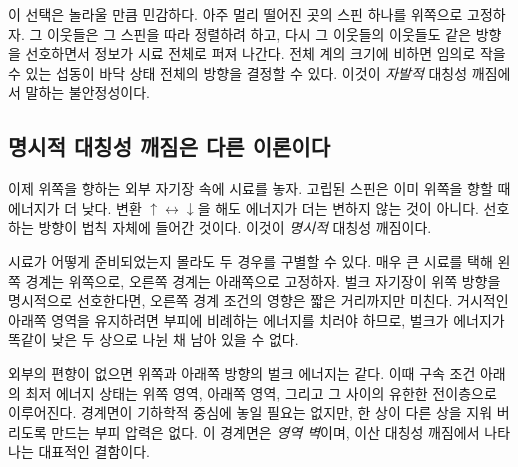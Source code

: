 이 선택은 놀라울 만큼 민감하다. 아주 멀리 떨어진 곳의 스핀 하나를 위쪽으로 고정하자. 그 이웃들은 그 스핀을 따라 정렬하려 하고, 다시 그 이웃들의 이웃들도 같은 방향을 선호하면서 정보가 시료 전체로 퍼져 나간다. 전체 계의 크기에 비하면 임의로 작을 수 있는 섭동이 바닥 상태 전체의 방향을 결정할 수 있다. 이것이 \emph{자발적} 대칭성 깨짐에서 말하는 불안정성이다.

\begin{classroomqa}
\end{classroomqa}

\begin{classroomqa}
\end{classroomqa}

\subsection{명시적 대칭성 깨짐은 다른 이론이다}

이제 위쪽을 향하는 외부 자기장 속에 시료를 놓자. 고립된 스핀은 이미 위쪽을 향할 때 에너지가 더 낮다. 변환 \(\uparrow\leftrightarrow\downarrow\)을 해도 에너지가 더는 변하지 않는 것이 아니다. 선호하는 방향이 법칙 자체에 들어간 것이다. 이것이 \emph{명시적} 대칭성 깨짐이다.

시료가 어떻게 준비되었는지 몰라도 두 경우를 구별할 수 있다. 매우 큰 시료를 택해 왼쪽 경계는 위쪽으로, 오른쪽 경계는 아래쪽으로 고정하자. 벌크 자기장이 위쪽 방향을 명시적으로 선호한다면, 오른쪽 경계 조건의 영향은 짧은 거리까지만 미친다. 거시적인 아래쪽 영역을 유지하려면 부피에 비례하는 에너지를 치러야 하므로, 벌크가 에너지가 똑같이 낮은 두 상으로 나뉜 채 남아 있을 수 없다.

외부의 편향이 없으면 위쪽과 아래쪽 방향의 벌크 에너지는 같다. 이때 구속 조건 아래의 최저 에너지 상태는 위쪽 영역, 아래쪽 영역, 그리고 그 사이의 유한한 전이층으로 이루어진다. 경계면이 기하학적 중심에 놓일 필요는 없지만, 한 상이 다른 상을 지워 버리도록 만드는 부피 압력은 없다. 이 경계면은 \emph{영역 벽}이며, 이산 대칭성 깨짐에서 나타나는 대표적인 결함이다.

